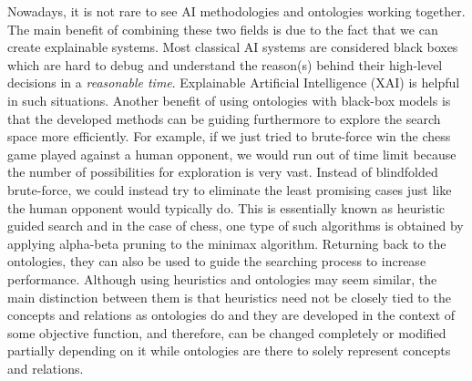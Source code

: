 Nowadays, it is not rare to see AI methodologies and ontologies working together. The main benefit 
of combining these two fields is due to the fact that we can create explainable systems. Most 
classical AI systems are considered black boxes which are hard to debug and understand the reason(s) 
behind their high-level decisions in a \textit{reasonable time}. Explainable Artificial Intelligence 
(XAI) \cite{samek2017} is helpful in such situations. Another benefit of using ontologies with black-box models is 
that the developed methods can be guiding furthermore to explore the search space more efficiently. 
For example, if we just tried to brute-force win the chess game played against a human opponent, 
we would run out of time limit because the number of possibilities for exploration is very vast. 
Instead of blindfolded brute-force, we could instead try to eliminate the least promising cases 
just like the human opponent would typically do. This is essentially known as heuristic guided 
search and in the case of chess, one type of such algorithms is obtained by applying alpha-beta 
pruning to the minimax algorithm. Returning back to the ontologies, they can also be used to guide 
the searching process to increase performance. Although using heuristics and ontologies 
may seem similar, the main distinction between them is that heuristics need not be closely tied 
to the concepts and relations as ontologies do and they are developed in the context of some 
objective function, and therefore, can be changed completely or modified partially depending on it 
while ontologies are there to solely represent concepts and relations.

